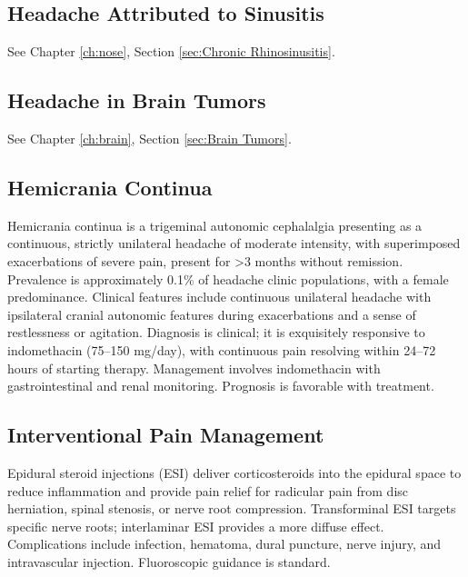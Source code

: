 \subsection{Headache Attributed to Sinusitis}
\label{sec:Headache Sinusitis}

See Chapter \ref{ch:nose}, Section \ref{sec:Chronic Rhinosinusitis}.

\subsection{Headache in Brain Tumors}
\label{sec:Headache Brain Tumors}

See Chapter \ref{ch:brain}, Section \ref{sec:Brain Tumors}.

\subsection{Hemicrania Continua}
\label{sec:Hemicrania Continua}
Hemicrania continua is a trigeminal autonomic cephalalgia presenting as a continuous, strictly unilateral headache of moderate intensity, with superimposed exacerbations of severe pain, present for >3 months without remission. Prevalence is approximately 0.1\% of headache clinic populations, with a female predominance. Clinical features include continuous unilateral headache with ipsilateral cranial autonomic features during exacerbations and a sense of restlessness or agitation. Diagnosis is clinical; it is exquisitely responsive to indomethacin (75--150 mg/day), with continuous pain resolving within 24--72 hours of starting therapy. Management involves indomethacin with gastrointestinal and renal monitoring. Prognosis is favorable with treatment.

\subsection{Interventional Pain Management}
\label{sec:Interventional Pain Management}

Epidural steroid injections (ESI) deliver corticosteroids into the epidural space to reduce inflammation and provide pain relief for radicular pain from disc herniation, spinal stenosis, or nerve root compression. Transforminal ESI targets specific nerve roots; interlaminar ESI provides a more diffuse effect. Complications include infection, hematoma, dural puncture, nerve injury, and intravascular injection. Fluoroscopic guidance is standard.

